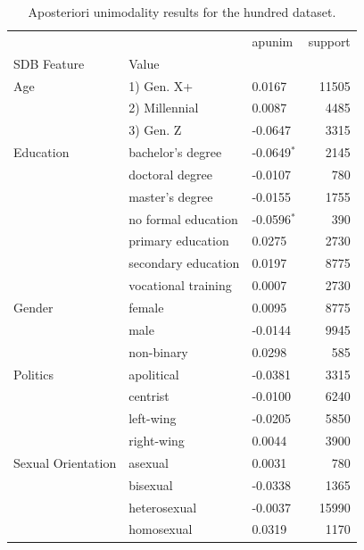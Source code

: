 \begin{table}[ht]\centering
\caption{Aposteriori unimodality results for the hundred dataset.}
\label{tab:hundred}
\begin{tabular}{lllr}
\toprule
 &  & apunim & support \\
SDB Feature & Value &  &  \\
\midrule
Age & 1) Gen. X+ & 0.0167 & 11505 \\
 & 2) Millennial & 0.0087 & 4485 \\
 & 3) Gen. Z & -0.0647 & 3315 \\
Education & bachelor's degree & -0.0649$^{*}$ & 2145 \\
 & doctoral degree & -0.0107 & 780 \\
 & master's degree & -0.0155 & 1755 \\
 & no formal education & -0.0596$^{*}$ & 390 \\
 & primary education & 0.0275 & 2730 \\
 & secondary education & 0.0197 & 8775 \\
 & vocational training & 0.0007 & 2730 \\
Gender & female & 0.0095 & 8775 \\
 & male & -0.0144 & 9945 \\
 & non-binary & 0.0298 & 585 \\
Politics & apolitical & -0.0381 & 3315 \\
 & centrist & -0.0100 & 6240 \\
 & left-wing & -0.0205 & 5850 \\
 & right-wing & 0.0044 & 3900 \\
Sexual Orientation & asexual & 0.0031 & 780 \\
 & bisexual & -0.0338 & 1365 \\
 & heterosexual & -0.0037 & 15990 \\
 & homosexual & 0.0319 & 1170 \\
\bottomrule
\end{tabular}
\end{table}
